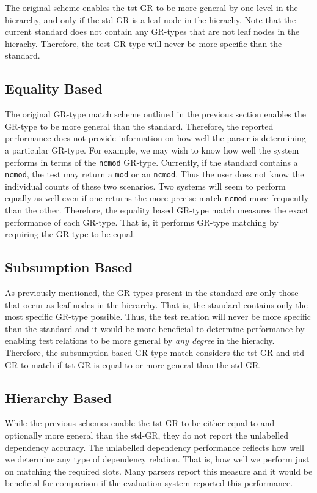 \documentclass[10pt]{article}
\newcommand{\stt}[1]{{\small\texttt{#1}}}
\begin{document}
The original scheme enables the tst-GR to be more general by one level
in the hierarchy, and only if the std-GR is a leaf node in the hierachy.
Note that the current standard does not contain
any GR-types that are not leaf nodes in the hierachy. Therefore,
the test GR-type will never be more specific than the standard.

\subsection{Equality Based}

The original GR-type match scheme outlined in the previous section
enables the GR-type to be more general than the standard. Therefore,
the reported performance does not provide information on how
well the parser is determining a particular GR-type.
For example, we may wish to know how well the system performs 
in terms of the \stt{ncmod} GR-type.
Currently, if the standard contains a \stt{ncmod}, the test
may return a \stt{mod} or an \stt{ncmod}. Thus the user 
does not know the individual counts of these two scenarios. Two
systems will seem to perform equally as well even if one returns
the more precise match \stt{ncmod} more frequently than
 the other.
Therefore, the equality based GR-type match measures the exact performance 
of each GR-type. That is, it performs GR-type matching by requiring the GR-type 
to be equal.

\subsection{Subsumption Based}

As previously mentioned, 
the GR-types present in the standard are only those that occur 
as leaf nodes in the hierarchy. That is, the standard contains
only the most specific GR-type possible. 
Thus, the test relation will never be more specific 
than the standard and it would be more beneficial 
to determine performance by enabling test relations 
to be more general by \emph{any degree} in the hierachy.
Therefore, the subsumption based GR-type match considers
the tst-GR and std-GR to match if
tst-GR is equal to or more general than the std-GR.

\subsection{Hierarchy Based}
\label{hier}

While the previous schemes enable the tst-GR to
be either equal to and optionally more general than the std-GR,
they do not report the unlabelled dependency accuracy.
The unlabelled dependency performance reflects how well we 
determine any type of dependency relation. That is,
how well we perform just on matching the required slots.
Many parsers report this measure and it would be beneficial for
comparison if the evaluation system reported this performance.
\end{document}
